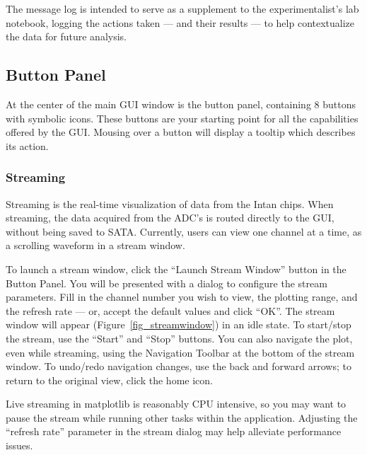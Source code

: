 The message log is intended to serve as a supplement to the experimentalist's lab notebook, logging the actions taken --- and their results --- to help contextualize the data for future analysis.


\subsection{Button Panel}
\label{sec_usage_buttonpanel}

At the center of the main GUI window is the button panel, containing 8 buttons with symbolic icons. These buttons are your starting point for all the capabilities offered by the GUI. Mousing over a button will display a tooltip which describes its action.

\subsubsection{Streaming}
\label{sec_usage_buttonpanel_streaming}

Streaming is the real-time visualization of data from the Intan chips. When streaming, the data acquired from the ADC's is routed directly to the GUI, without being saved to SATA. Currently, users can view one channel at a time, as a scrolling waveform in a stream window.

To launch a stream window, click the ``Launch Stream Window'' button in the Button Panel. You will be presented with a dialog to configure the stream parameters. Fill in the channel number you wish to view, the plotting range, and the refresh rate --- or, accept the default values and click ``OK''. The stream window will appear (Figure~\ref{fig_streamwindow}) in an idle state. To start/stop the stream, use the ``Start'' and ``Stop'' buttons. You can also navigate the plot, even while streaming, using the Navigation Toolbar at the bottom of the stream window. To undo/redo navigation changes, use the back and forward arrows; to return to the original view, click the home icon.

Live streaming in matplotlib is reasonably CPU intensive, so you may want to pause the stream while running other tasks within the application. Adjusting the ``refresh rate'' parameter in the stream dialog may help alleviate performance issues.

